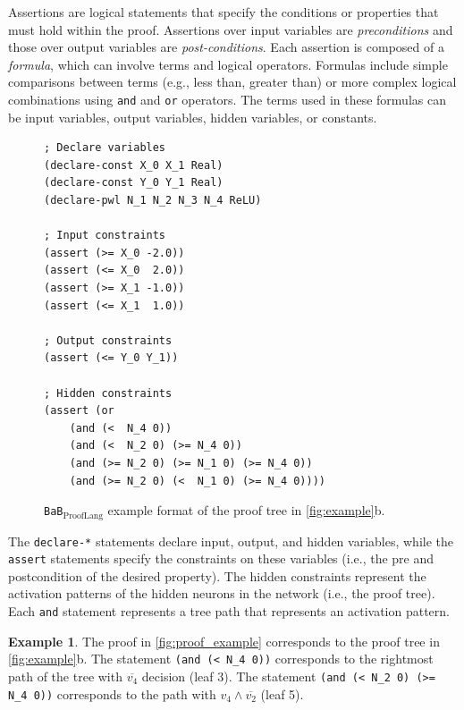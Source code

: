\documentclass[oneside,11pt,dvipsnames]{book}
\numberwithin{equation}{section}
\theoremstyle{definition}
\newtheorem{example}{Example}[section]
\theoremstyle{remark}
\newcommand{\functiontextformat}[1]{\textrm{\texttt{#1}}}
\newcommand{\tvn}[1]{\iftoggle{usecomment}{{\color{red}{[TVN]: #1}}}{}}
\newcommand{\hd}[1]{\iftoggle{usecomment}{{\color{blue}{[HD]: #1}}}{}}
\newcommand{\prooflang}{\texttt{BaB$_{\text{ProofLang}}$}}
\begin{document}
Assertions are logical statements that specify the conditions or properties that must hold within the proof. Assertions over input variables are \emph{preconditions} and those over output variables are \emph{post-conditions}. Each assertion is composed of a \textit{formula}, which can involve terms and logical operators. Formulas include simple comparisons between terms (e.g., less than, greater than) or more complex logical combinations using \functiontextformat{and} and \functiontextformat{or} operators. The terms used in these formulas can be input variables, output variables, hidden variables, or constants.

\begin{figure}
\begin{lstlisting}[style=SMTLIB-style, language=SMTLIB, basicstyle=\ttfamily\scriptsize]
; Declare variables
(declare-const X_0 X_1 Real)
(declare-const Y_0 Y_1 Real)
(declare-pwl N_1 N_2 N_3 N_4 ReLU)

; Input constraints
(assert (>= X_0 -2.0))
(assert (<= X_0  2.0))
(assert (>= X_1 -1.0))
(assert (<= X_1  1.0))

; Output constraints
(assert (<= Y_0 Y_1)) 

; Hidden constraints
(assert (or 
    (and (<  N_4 0))
    (and (<  N_2 0) (>= N_4 0))
    (and (>= N_2 0) (>= N_1 0) (>= N_4 0))
    (and (>= N_2 0) (<  N_1 0) (>= N_4 0))))
\end{lstlisting}
\caption{\prooflang{} example format of the proof tree in \autoref{fig:example}b. 
}
\label{fig:proof_example}
\end{figure}


The \texttt{declare-*} statements declare input, output, and hidden variables, while the \texttt{assert} statements specify the constraints on these variables (i.e., the pre and postcondition of the desired property).
The hidden constraints represent the activation patterns of the hidden neurons in the network (i.e., the proof tree). Each \texttt{and} statement represents a tree path that represents an activation pattern. 



\begin{example} 
    The proof in \autoref{fig:proof_example} corresponds to the proof tree in \autoref{fig:example}b. The statement \texttt{(and (< N\_4 0))} corresponds to the rightmost path of the tree with $\overline{v_4}$ decision (leaf 3).  The statement \texttt{(and (< N\_2 0) (>= N\_4 0))} corresponds to the path with $v_4 \land \overline{v_2}$ (leaf 5). 
\end{example}
\end{document}
